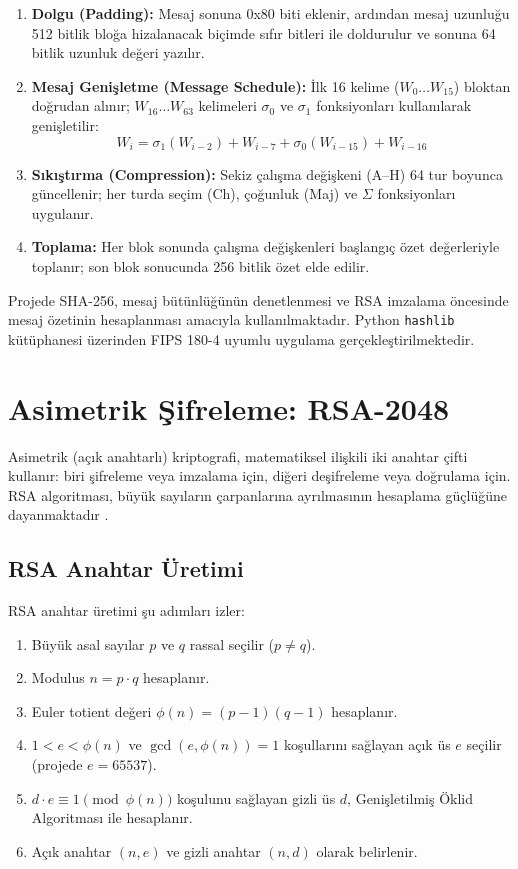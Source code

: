 \begin{enumerate}
    \item \textbf{Dolgu (Padding):} Mesaj sonuna 0x80 biti eklenir, ardından mesaj uzunluğu 512 bitlik bloğa hizalanacak biçimde sıfır bitleri ile doldurulur ve sonuna 64 bitlik uzunluk değeri yazılır.
    \item \textbf{Mesaj Genişletme (Message Schedule):} İlk 16 kelime ($W_0 \ldots W_{15}$) bloktan doğrudan alınır; $W_{16} \ldots W_{63}$ kelimeleri $\sigma_0$ ve $\sigma_1$ fonksiyonları kullanılarak genişletilir:
        \begin{equation}
            W_i = \sigma_1(W_{i-2}) + W_{i-7} + \sigma_0(W_{i-15}) + W_{i-16}
        \end{equation}
    \item \textbf{Sıkıştırma (Compression):} Sekiz çalışma değişkeni (A–H) 64 tur boyunca güncellenir; her turda seçim (Ch), çoğunluk (Maj) ve $\Sigma$ fonksiyonları uygulanır.
    \item \textbf{Toplama:} Her blok sonunda çalışma değişkenleri başlangıç özet değerleriyle toplanır; son blok sonucunda 256 bitlik özet elde edilir.
\end{enumerate}

Projede SHA-256, mesaj bütünlüğünün denetlenmesi ve RSA imzalama öncesinde mesaj özetinin hesaplanması amacıyla kullanılmaktadır. Python \texttt{hashlib} kütüphanesi üzerinden FIPS 180-4 uyumlu uygulama gerçekleştirilmektedir.

	\section{Asimetrik Şifreleme: RSA-2048}

Asimetrik (açık anahtarlı) kriptografi, matematiksel ilişkili iki anahtar çifti kullanır: biri şifreleme veya imzalama için, diğeri deşifreleme veya doğrulama için. RSA algoritması, büyük sayıların çarpanlarına ayrılmasının hesaplama güçlüğüne dayanmaktadır \cite{RSA1978}.

	\subsection{RSA Anahtar Üretimi}

RSA anahtar üretimi şu adımları izler:

\begin{enumerate}
    \item Büyük asal sayılar $p$ ve $q$ rassal seçilir ($p \neq q$).
    \item Modulus $n = p \cdot q$ hesaplanır.
    \item Euler totient değeri $\phi(n) = (p-1)(q-1)$ hesaplanır.
    \item $1 < e < \phi(n)$ ve $\gcd(e, \phi(n)) = 1$ koşullarını sağlayan açık üs $e$ seçilir (projede $e = 65537$).
    \item $d \cdot e \equiv 1 \pmod{\phi(n)}$ koşulunu sağlayan gizli üs $d$, Genişletilmiş Öklid Algoritması ile hesaplanır.
    \item Açık anahtar $(n, e)$ ve gizli anahtar $(n, d)$ olarak belirlenir.
\end{enumerate}

